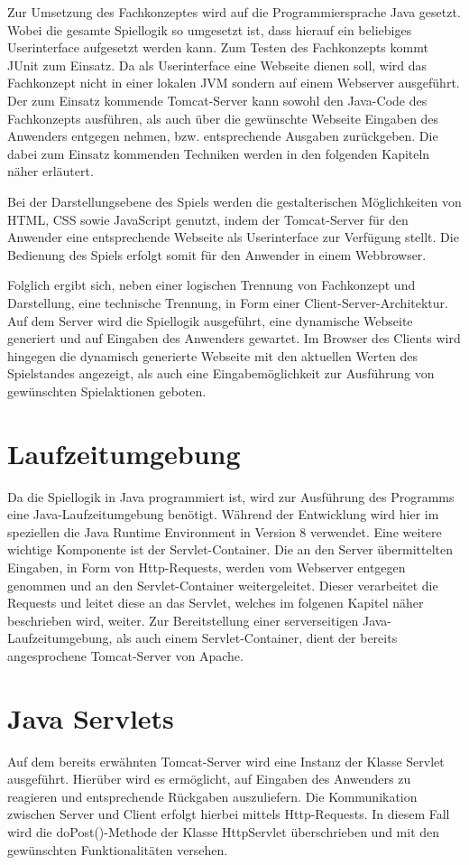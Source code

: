 Zur Umsetzung des Fachkonzeptes wird auf die Programmiersprache Java gesetzt. Wobei die gesamte Spiellogik so umgesetzt ist, dass hierauf ein beliebiges Userinterface aufgesetzt werden kann. Zum Testen des Fachkonzepts kommt JUnit zum Einsatz. Da als Userinterface eine Webseite dienen soll, wird das Fachkonzept nicht in einer lokalen JVM sondern auf einem Webserver ausgeführt. Der zum Einsatz kommende Tomcat-Server kann sowohl den Java-Code des Fachkonzepts ausführen, als auch über die gewünschte Webseite Eingaben des Anwenders entgegen nehmen, bzw. entsprechende Ausgaben zurückgeben. Die dabei zum Einsatz kommenden Techniken werden in den folgenden Kapiteln näher erläutert.

Bei der Darstellungsebene des Spiels werden die gestalterischen Möglichkeiten von HTML, CSS sowie JavaScript genutzt, indem der Tomcat-Server für den Anwender eine entsprechende Webseite als Userinterface zur Verfügung stellt. Die Bedienung des Spiels erfolgt somit für den Anwender in einem Webbrowser.

Folglich ergibt sich, neben einer logischen Trennung von Fachkonzept und Darstellung, eine technische Trennung, in Form einer Client-Server-Architektur. Auf dem Server wird die Spiellogik ausgeführt, eine dynamische Webseite generiert und auf Eingaben des Anwenders gewartet. Im Browser des Clients wird hingegen die dynamisch generierte Webseite mit den aktuellen Werten des Spielstandes angezeigt, als auch eine Eingabemöglichkeit zur Ausführung von gewünschten Spielaktionen geboten.

\section{Laufzeitumgebung}
Da die Spiellogik in Java programmiert ist, wird zur Ausführung des Programms eine Java-Laufzeitumgebung benötigt. Während der Entwicklung wird hier im speziellen die Java Runtime Environment in Version 8 verwendet. Eine weitere wichtige Komponente ist der Servlet-Container. Die an den Server übermittelten Eingaben, in Form von Http-Requests, werden vom Webserver entgegen genommen und an den Servlet-Container weitergeleitet. Dieser verarbeitet die Requests und leitet diese an das Servlet, welches im folgenen Kapitel näher beschrieben wird, weiter. Zur Bereitstellung einer serverseitigen Java-Laufzeitumgebung, als auch einem Servlet-Container, dient der bereits angesprochene Tomcat-Server von Apache.

\section{Java Servlets}\label{sec:Servlets}
Auf dem bereits erwähnten Tomcat-Server wird eine Instanz der Klasse Servlet ausgeführt. Hierüber wird es ermöglicht, auf Eingaben des Anwenders zu reagieren und entsprechende Rückgaben auszuliefern. Die Kommunikation zwischen Server und Client erfolgt hierbei mittels Http-Requests. In diesem Fall wird die doPost()-Methode der Klasse HttpServlet überschrieben und mit den gewünschten Funktionalitäten versehen.

